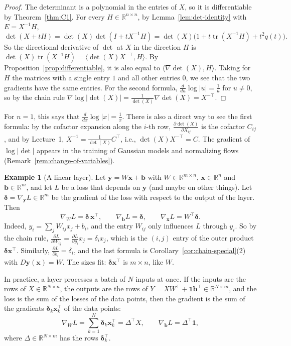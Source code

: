 \documentclass[11pt]{article}
\newcommand{\ip}[2]{\langle #1, #2 \rangle}
\theoremstyle{definition}
\newtheorem{example}[definition]{Example}
\theoremstyle{plain}
\theoremstyle{remark}
\DeclareMathOperator{\tr}{tr}
\begin{document}
\begin{proof}
    The determinant is a polynomial in the entries of $X$, so it is differentiable by Theorem~\ref{thm:C1}. For every $H \in \mathbb{R}^{n \times n}$, by Lemma~\ref{lem:det-identity} with $E = X^{-1}H$,
    \[\det(X + tH) = \det(X)\det(I + tX^{-1}H) = \det(X)\big(1 + t\tr(X^{-1}H) + t^2 q(t)\big).\]
    So the directional derivative of $\det$ at $X$ in the direction $H$ is $\det(X)\tr(X^{-1}H) = \ip{\det(X) X^{-\top}}{H}$. By Proposition~\ref{prop:differentiable}, it is also equal to $\ip{\nabla \det(X)}{H}$. Taking for $H$ the matrices with a single entry $1$ and all other entries $0$, we see that the two gradients have the same entries. For the second formula, $\frac{d}{du}\log|u| = \frac{1}{u}$ for $u \neq 0$, so by the chain rule $\nabla \log|\det(X)| = \frac{1}{\det(X)} \nabla\det(X) = X^{-\top}$.
\end{proof}

For $n = 1$, this says that $\frac{d}{dx}\log|x| = \frac{1}{x}$. There is also a direct way to see the first formula: by the cofactor expansion along the $i$-th row, $\frac{\partial \det(X)}{\partial X_{ij}}$ is the cofactor $C_{ij}$, and by Lecture~1, $X^{-1} = \frac{1}{\det(X)}C^\top$, i.e., $\det(X)X^{-\top} = C$. The gradient of $\log|\det|$ appears in the training of Gaussian models and normalizing flows (Remark~\ref{rem:change-of-variables}).

\begin{example}[A linear layer]\label{ex:linear-layer}
    Let $\mathbf{y} = W\mathbf{x} + \mathbf{b}$ with $W \in \mathbb{R}^{m \times n}$, $\mathbf{x} \in \mathbb{R}^n$ and $\mathbf{b} \in \mathbb{R}^m$, and let $L$ be a loss that depends on $\mathbf{y}$ (and maybe on other things). Let $\boldsymbol{\delta} = \nabla_{\mathbf{y}} L \in \mathbb{R}^m$ be the gradient of the loss with respect to the output of the layer. Then
    \[\nabla_W L = \boldsymbol{\delta} \, \mathbf{x}^\top, \qquad \nabla_{\mathbf{b}} L = \boldsymbol{\delta}, \qquad \nabla_{\mathbf{x}} L = W^\top \boldsymbol{\delta}.\]
    Indeed, $y_i = \sum_j W_{ij} x_j + b_i$, and the entry $W_{ij}$ only influences $L$ through $y_i$. So by the chain rule, $\frac{\partial L}{\partial W_{ij}} = \frac{\partial L}{\partial y_i} x_j = \delta_i x_j$, which is the $(i, j)$ entry of the outer product $\boldsymbol{\delta}\mathbf{x}^\top$. Similarly, $\frac{\partial L}{\partial b_i} = \delta_i$, and the last formula is Corollary~\ref{cor:chain-special}(2) with $D\mathbf{y}(\mathbf{x}) = W$. The sizes fit: $\boldsymbol{\delta}\mathbf{x}^\top$ is $m \times n$, like $W$.

    In practice, a layer processes a batch of $N$ inputs at once. If the inputs are the rows of $X \in \mathbb{R}^{N \times n}$, the outputs are the rows of $Y = XW^\top + \mathbf{1}\mathbf{b}^\top \in \mathbb{R}^{N \times m}$, and the loss is the sum of the losses of the data points, then the gradient is the sum of the gradients $\boldsymbol{\delta}_k \mathbf{x}_k^\top$ of the data points:
    \[\nabla_W L = \sum_{k=1}^N \boldsymbol{\delta}_k \mathbf{x}_k^\top = \Delta^\top X, \qquad \nabla_{\mathbf{b}} L = \Delta^\top \mathbf{1},\]
    where $\Delta \in \mathbb{R}^{N \times m}$ has the rows $\boldsymbol{\delta}_k^\top$.
\end{example}
\end{document}

